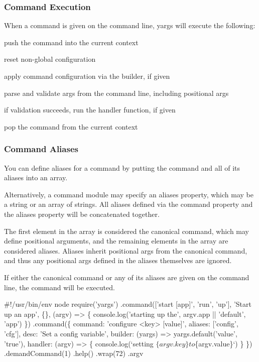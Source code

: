 \subsubsection*{Command Execution}

When a command is given on the command line, yargs will execute the following\+:


\begin{DoxyEnumerate}
\item push the command into the current context
\item reset non-\/global configuration
\item apply command configuration via the {\ttfamily builder}, if given
\item parse and validate args from the command line, including positional args
\item if validation succeeds, run the {\ttfamily handler} function, if given
\item pop the command from the current context
\end{DoxyEnumerate}

\subsubsection*{Command Aliases}

You can define aliases for a command by putting the command and all of its aliases into an array.

Alternatively, a command module may specify an {\ttfamily aliases} property, which may be a string or an array of strings. All aliases defined via the {\ttfamily command} property and the {\ttfamily aliases} property will be concatenated together.

The first element in the array is considered the canonical command, which may define positional arguments, and the remaining elements in the array are considered aliases. Aliases inherit positional args from the canonical command, and thus any positional args defined in the aliases themselves are ignored.

If either the canonical command or any of its aliases are given on the command line, the command will be executed.


\begin{DoxyCode}
#!/usr/bin/env node
require('yargs')
  .command(['start [app]', 'run', 'up'], 'Start up an app', \{\}, (argv) => \{
    console.log('starting up the', argv.app || 'default', 'app')
  \})
  .command(\{
    command: 'configure <key> [value]',
    aliases: ['config', 'cfg'],
    desc: 'Set a config variable',
    builder: (yargs) => yargs.default('value', 'true'),
    handler: (argv) => \{
      console.log(`setting $\{argv.key\} to $\{argv.value\}`)
    \}
  \})
  .demandCommand(1)
  .help()
  .wrap(72)
  .argv
\end{DoxyCode}



